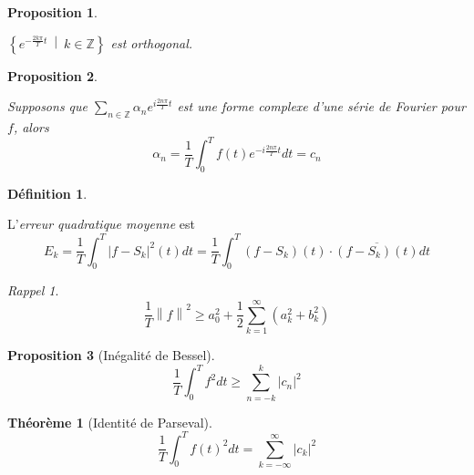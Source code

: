 \documentclass{report}
\newcommand*{\dsum}[4]{\displaystyle\sum_{#1=#2}^{#3}#4}
\newcommand*{\dint}[3]{\displaystyle\int_{#1}^{#2}#3}
\newcommand*{\norme}[1]{\left\| #1 \right\|}
\newcommand*{\abs}[1]{\left| #1 \right|}
\newcommand*{\gte}{\geqslant}
\newcommand*{\entiers}{\mathbb{Z}}
\newtheorem*{thm}{Th\'eor\`eme}
\newtheorem*{prop}{Proposition}
\theoremstyle{definition}
\newtheorem*{defin}{D\'efinition}
\theoremstyle{remark}
\newtheorem*{rapp}{Rappel}
\begin{document}
	\begin{prop}~

		$\left\{ e^{-\frac{2k\pi}{T}t} ~\middle|~ k \in \entiers \right\}$ est orthogonal.
	\end{prop}
	\begin{prop}~

		Supposons que $\displaystyle\sum_{n \in \entiers} \alpha_n e^{i\frac{2n\pi}{T}t}$ est une forme complexe d'une s\'erie de Fourier pour $f$, alors
		\begin{equation*}
			\alpha_n = \dfrac{1}{T} \dint{0}{T}{f(t) e^{-i\frac{2n\pi}{T}t} dt} = c_n
		\end{equation*}
	\end{prop}
	\begin{defin}~

		L'\emph{erreur quadratique moyenne} est
		\begin{equation*}
			E_k = \dfrac{1}{T} \dint{0}{T}{\abs{f-S_k}^2(t) dt} = \dfrac{1}{T} \dint{0}{T}{(f-S_k)(t) \cdot \overline{(f-S_k)(t)} dt}
		\end{equation*}
	\end{defin}
	\begin{rapp}
		\begin{equation*}
			\dfrac{1}{T} \norme{f}^2 \gte a_0^2 + \dfrac{1}{2} \dsum{k}{1}{\infty}{\left( a_k^2+b_k^2 \right)}
		\end{equation*}
	\end{rapp}
	\begin{prop}[In\'egalit\'e de Bessel]
		\begin{equation*}
			\dfrac{1}{T} \dint{0}{T}{f^2 dt} \gte \dsum{n}{-k}{k}{\abs{c_n}^2}
		\end{equation*}
	\end{prop}
	\begin{thm}[Identit\'e de Parseval]
		\begin{equation*}
			\dfrac{1}{T} \dint{0}{T}{f(t)^2 dt} = \dsum{k}{-\infty}{\infty}{\abs{c_k}^2}
		\end{equation*}
	\end{thm}
\end{document}
